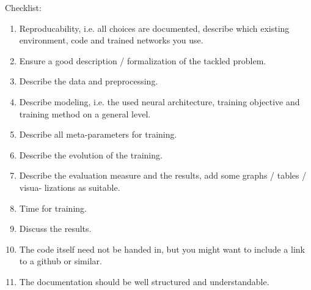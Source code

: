 \documentclass[11pt]{article}
\begin{document}
    Checklist:
    \begin{enumerate}
        \item Reproducability, i.e. all choices are documented, describe which existing environment, code and trained networks you use.
        \item Ensure a good description / formalization of the tackled problem.
        \item Describe the data and preprocessing.
        \item Describe modeling, i.e. the used neural architecture, training objective and training method on a general level.
        \item Describe all meta-parameters for training.
        \item Describe the evolution of the training.
        \item Describe the evaluation measure and the results, add some graphs / tables / visua- lizations as suitable.
        \item Time for training.
        \item Discuss the results.
        \item The code itself need not be handed in, but you might want to include a link to a github or similar.
        \item The documentation should be well structured and understandable.
    \end{enumerate}
\end{document}
